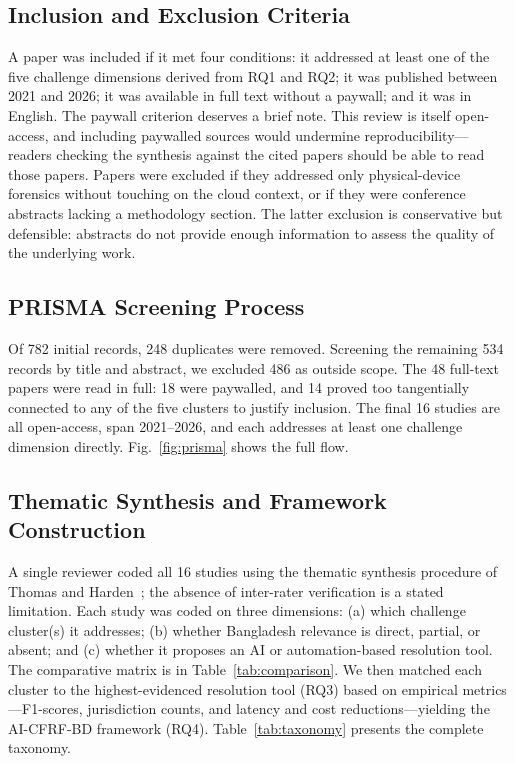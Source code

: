 \documentclass[sigconf,nonacm]{acmart}
\begin{document}
\subsection{Inclusion and Exclusion Criteria}

A paper was included if it met four conditions: it addressed at least one
of the five challenge dimensions derived from RQ1 and RQ2; it was
published between 2021 and 2026; it was available in full text without a
paywall; and it was in English. The paywall criterion deserves a brief
note. This review is itself open-access, and including paywalled sources
would undermine reproducibility---readers checking the synthesis against
the cited papers should be able to read those papers. Papers were
excluded if they addressed only physical-device forensics without
touching on the cloud context, or if they were conference abstracts
lacking a methodology section. The latter exclusion is conservative but
defensible: abstracts do not provide enough information to assess the
quality of the underlying work.

\subsection{PRISMA Screening Process}

Of 782 initial records, 248 duplicates were removed. Screening the
remaining 534 records by title and abstract, we excluded 486 as outside
scope. The 48 full-text papers were read in full: 18 were paywalled, and
14 proved too tangentially connected to any of the five clusters to
justify inclusion. The final 16 studies are all open-access, span
2021--2026, and each addresses at least one challenge dimension directly.
Fig.~\ref{fig:prisma} shows the full flow.

\subsection{Thematic Synthesis and Framework Construction}

A single reviewer coded all 16 studies using the thematic synthesis
procedure of Thomas and Harden~\cite{thomas2008}; the absence of
inter-rater verification is a stated limitation. Each study was coded on
three dimensions: (a) which challenge cluster(s) it addresses; (b)
whether Bangladesh relevance is direct, partial, or absent; and (c)
whether it proposes an AI or automation-based resolution tool. The
comparative matrix is in Table~\ref{tab:comparison}. We then matched
each cluster to the highest-evidenced resolution tool (RQ3) based on
empirical metrics---F1-scores, jurisdiction counts, and latency and cost
reductions---yielding the AI-CFRF-BD framework (RQ4).
Table~\ref{tab:taxonomy} presents the complete taxonomy.
\end{document}
